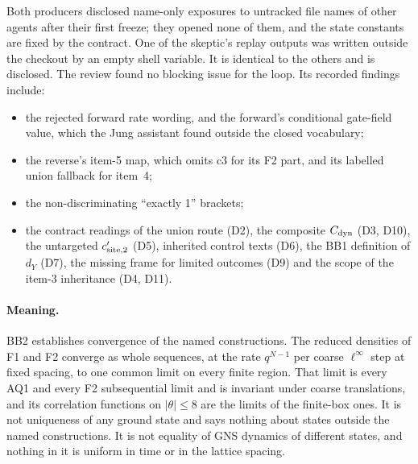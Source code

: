 Both producers disclosed name-only exposures to untracked file names of other
agents after their first freeze; they opened none of them, and the state
constants are fixed by the contract. One of the skeptic's replay outputs was
written outside the checkout by an empty shell variable. It is identical to
the others and is disclosed. The review found no blocking issue for the
loop. Its recorded findings include:
\begin{itemize}
\item the rejected forward rate wording, and the forward's conditional
 gate-field value, which the Jung assistant found outside the closed
 vocabulary;
\item the reverse's item-5 map, which omits c3 for its F2 part, and its
 labelled union fallback for item~4;
\item the non-discriminating ``exactly 1'' brackets;
\item the contract readings of the union route (D2), the composite $C_{\rm
 dyn}$ (D3, D10), the untargeted $c'_{{\rm site},2}$ (D5), inherited control
 texts (D6), the BB1 definition of $d_Y$ (D7), the missing frame for limited
 outcomes (D9) and the scope of the item-3 inheritance (D4, D11).
\end{itemize}

\paragraph{Meaning.} BB2 establishes convergence of the named constructions.
The reduced densities of F1 and F2 converge as whole sequences, at the rate
$q^{N-1}$ per coarse $\ell^\infty$ step at fixed spacing, to one common limit
on every finite region. That limit is every AQ1 and every F2 subsequential
limit and is invariant under coarse translations, and its correlation
functions on $|\theta|\le8$ are the limits of the finite-box ones. It is not
uniqueness of any ground state and says nothing about states outside the
named constructions. It is not equality of GNS dynamics of different states,
and nothing in it is uniform in time or in the lattice spacing.

